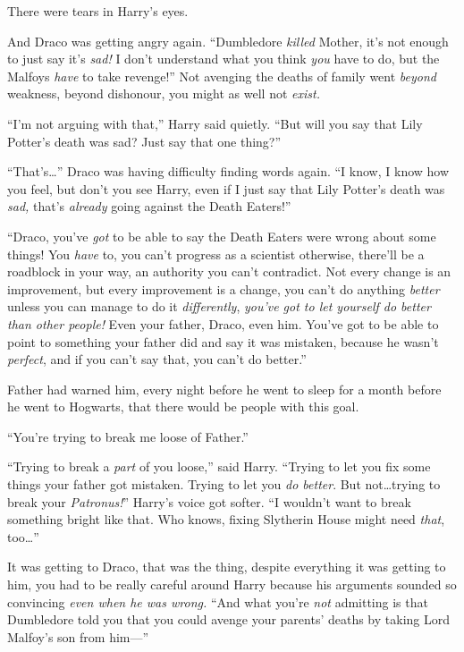 There were tears in Harry’s eyes.

And Draco was getting angry again. “Dumbledore \emph{killed} Mother, it’s not enough to just say it’s \emph{sad!} I don’t understand what you think \emph{you} have to do, but the Malfoys \emph{have} to take revenge!” Not avenging the deaths of family went \emph{beyond} weakness, beyond dishonour, you might as well not \emph{exist.}

“I’m not arguing with that,” Harry said quietly. “But will you say that Lily Potter’s death was sad? Just say that one thing?”

“That’s…” Draco was having difficulty finding words again. “I know, I know how you feel, but don’t you see Harry, even if I just say that Lily Potter’s death was \emph{sad,} that’s \emph{already} going against the Death Eaters!”

“Draco, you’ve \emph{got} to be able to say the Death Eaters were wrong about some things! You \emph{have} to, you can’t progress as a scientist otherwise, there’ll be a roadblock in your way, an authority you can’t contradict. Not every change is an improvement, but every improvement is a change, you can’t do anything \emph{better} unless you can manage to do it \emph{differently}, \emph{you’ve got to let yourself do better than other people!} Even your father, Draco, even him. You’ve got to be able to point to something your father did and say it was mistaken, because he wasn’t \emph{perfect}, and if you can’t say that, you can’t do better.”

Father had warned him, every night before he went to sleep for a month before he went to Hogwarts, that there would be people with this goal.

“You’re trying to break me loose of Father.”

“Trying to break a \emph{part} of you loose,” said Harry. “Trying to let you fix some things your father got mistaken. Trying to let you \emph{do better}. But not…trying to break your \emph{Patronus!}” Harry’s voice got softer. “I wouldn’t want to break something bright like that. Who knows, fixing Slytherin House might need \emph{that}, too…”

It was getting to Draco, that was the thing, despite everything it was getting to him, you had to be really careful around Harry because his arguments sounded so convincing \emph{even when he was wrong.} “And what you’re \emph{not} admitting is that Dumbledore told you that you could avenge your parents’ deaths by taking Lord Malfoy’s son from him—”

